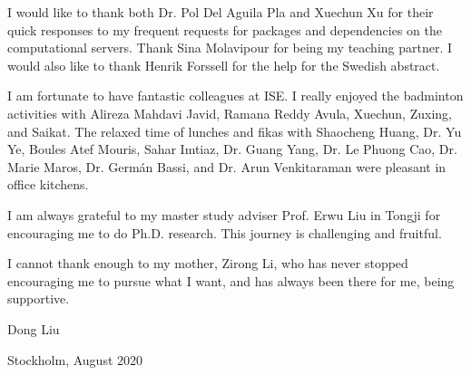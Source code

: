 I would like to thank both Dr. Pol Del Aguila Pla and Xuechun Xu for their quick responses to my frequent requests for packages and dependencies on the computational servers. Thank Sina Molavipour for being my teaching partner. I would also like to thank Henrik Forssell for the help for the Swedish abstract.


I am fortunate to have fantastic colleagues at ISE. I really enjoyed the badminton activities with Alireza Mahdavi Javid, Ramana Reddy Avula, Xuechun, Zuxing, and Saikat. The relaxed time of lunches and fikas with Shaocheng Huang, Dr. Yu Ye, Boules Atef Mouris, Sahar Imtiaz, Dr. Guang Yang, Dr. Le Phuong Cao, Dr. Marie Maros, Dr. Germ\'{a}n Bassi, and Dr. Arun Venkitaraman were pleasant in office kitchens.

I am always grateful to my master study adviser Prof. Erwu Liu in Tongji for encouraging me to do Ph.D. research. This journey is challenging and fruitful.

I cannot thank enough to my mother, Zirong Li, who has never stopped encouraging me to pursue what I want, and has always been there for me, being supportive. \newline
\newline


\hfill
Dong Liu

\hfill
Stockholm, August 2020





